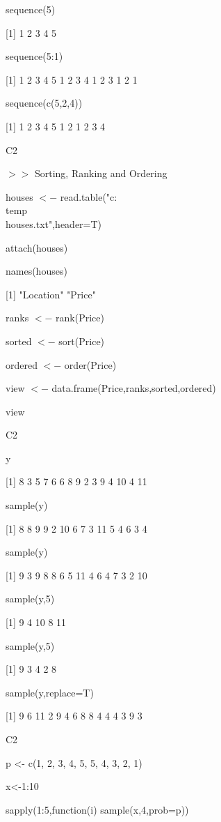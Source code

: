 \documentclass{beamer}
\theoremstyle{definition}
\theoremstyle{remark}
\begin{document}
\hfill

sequence(5)

[1] 1 2 3 4 5

\hfill

sequence(5:1)

[1] 1 2 3 4 5 1 2 3 4 1 2 3 1 2 1

\hfill

sequence(c(5,2,4))

[1] 1 2 3 4 5 1 2 1 2 3 4


\begin{frame}{C2}

$>>$ Sorting, Ranking and Ordering

\hfill

houses $<-$ read.table("c:\\temp \\houses.txt",header=T)

attach(houses)

names(houses)

[1] "Location" "Price"

\hfill

ranks $<-$ rank(Price)

sorted $<-$ sort(Price)

ordered $<-$ order(Price)

view $<-$ data.frame(Price,ranks,sorted,ordered)

view


\end{frame}


\begin{frame}{C2}

y

[1] 8 3 5 7 6 6 8 9 2 3 9 4 10 4 11

sample(y)

[1] 8 8 9 9 2 10 6 7 3 11 5 4 6 3 4

sample(y)

[1] 9 3 9 8 8 6 5 11 4 6 4 7 3 2 10

sample(y,5)

[1] 9 4 10 8 11

sample(y,5)

[1] 9 3 4 2 8

sample(y,replace=T)

[1] 9 6 11 2 9 4 6 8 8 4 4 4 3 9 3



\end{frame}


\begin{frame}{C2}

p <- c(1, 2, 3, 4, 5, 5, 4, 3, 2, 1)

x<-1:10

sapply(1:5,function(i) sample(x,4,prob=p))


\end{frame}
\end{document}
